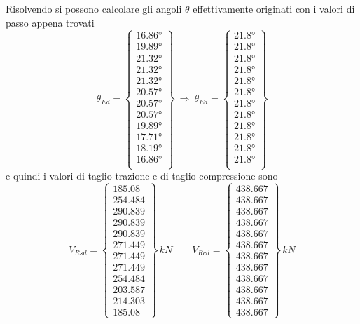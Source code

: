Risolvendo si possono calcolare gli angoli $\theta$ effettivamente originati con i valori di passo appena trovati
\[
\theta_{Ed} = 
\begin{Bmatrix}
	\ang{16.86}\\
	\ang{19.89}\\
	\ang{21.32}\\
	\ang{21.32}\\
	\ang{21.32}\\
	\ang{20.57}\\
	\ang{20.57}\\
	\ang{20.57}\\
	\ang{19.89}\\
	\ang{17.71}\\
	\ang{18.19}\\
	\ang{16.86}\\
\end{Bmatrix}~\Longrightarrow~\theta_{Ed} = 
\begin{Bmatrix}
	\ang{21.8}\\
	\ang{21.8}\\
	\ang{21.8}\\
	\ang{21.8}\\
	\ang{21.8}\\
	\ang{21.8}\\
	\ang{21.8}\\
	\ang{21.8}\\
	\ang{21.8}\\
	\ang{21.8}\\
	\ang{21.8}\\
	\ang{21.8}\\
\end{Bmatrix}
\]
e quindi i valori di taglio trazione e di taglio compressione sono
\[
V_{Rsd} = 
\begin{Bmatrix}
	185.08\\
	254.484\\
	290.839\\
	290.839\\
	290.839\\
	271.449\\
	271.449\\
	271.449\\
	254.484\\
	203.587\\
	214.303\\
	185.08
\end{Bmatrix}\,kN\qquad
V_{Rcd} = 
\begin{Bmatrix}
	438.667\\
	438.667\\
	438.667\\
	438.667\\
	438.667\\
	438.667\\
	438.667\\
	438.667\\
	438.667\\
	438.667\\
	438.667\\
	438.667
\end{Bmatrix}\,kN
\]

